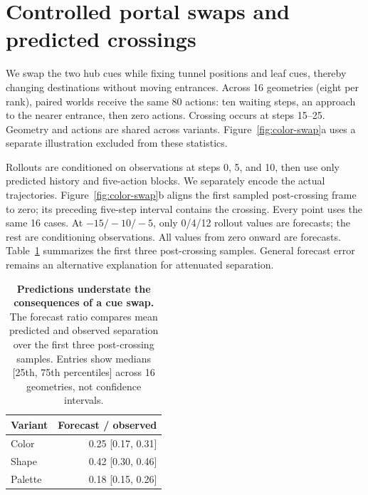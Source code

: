
\section{Controlled portal swaps and predicted crossings}
\label{app:portal-swap}

We swap the two hub cues while fixing tunnel positions and leaf cues,
thereby changing destinations without moving entrances. Across 16 geometries
(eight per rank), paired worlds receive the same 80 actions: ten waiting
steps, an approach to the nearer entrance, then zero actions. Crossing
occurs at steps 15--25. Geometry and actions are shared across variants.
Figure~\ref{fig:color-swap}a uses a separate illustration excluded from these
statistics.

Rollouts are conditioned on observations at steps 0, 5, and 10, then use
only predicted history and five-action blocks. We separately encode the
actual trajectories. Figure~\ref{fig:color-swap}b aligns the first sampled
post-crossing frame to zero; its preceding five-step interval contains the
crossing. Every point uses the same 16 cases. At $-15/-10/-5$, only 0/4/12
rollout values are forecasts; the rest are conditioning observations. All
values from zero onward are forecasts. Table~\ref{tab:swap} summarizes the
first three post-crossing samples. General forecast
error remains an alternative explanation for attenuated separation.

\begin{table}[!htbp]
\centering
\caption{\textbf{Predictions understate the consequences of a cue swap.}
The forecast ratio compares
mean predicted and observed separation over the first three post-crossing
samples. Entries show medians [25th, 75th percentiles] across 16 geometries,
not confidence intervals.}
\label{tab:swap}
\renewcommand{\arraystretch}{1.12}
\setlength{\tabcolsep}{4pt}
\begin{tabular}{@{}lr@{}}
\toprule
Variant & Forecast / observed \\
\midrule
Color & 0.25 [0.17, 0.31] \\
Shape & 0.42 [0.30, 0.46] \\
Palette & 0.18 [0.15, 0.26] \\
\bottomrule
\end{tabular}
\end{table}
